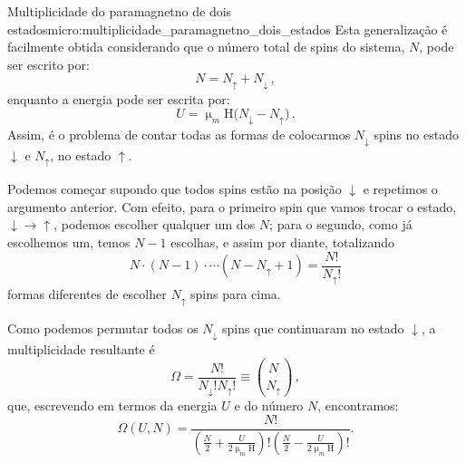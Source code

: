 \begin{example}{Multiplicidade do paramagnetno de dois estados}{micro:multiplicidade_paramagnetno_dois_estados}
        Esta generalização é facilmente obtida considerando que o número total de spins do sistema, $N$, pode ser escrito por:
        \[N = N_{\uparrow}+N_{\downarrow}\,,\]
        enquanto a energia pode ser escrita por:
        \[U=\upmu_m\mathrm{H}\big(N_{\downarrow}-N_{\uparrow}\big)\,.\]
        Assim, é o problema de contar todas as formas de colocarmos $N_{\downarrow}$ spins no estado $\downarrow$ e $N_{\uparrow}$, no estado $\uparrow$.

        Podemos começar supondo que todos spins estão na posição $\downarrow$ e repetimos o argumento anterior. Com efeito, para o primeiro spin que vamos trocar o estado, $\downarrow\to\uparrow$, podemos escolher qualquer um dos $N$; para o segundo, como já escolhemos um, temos $N-1$ escolhas, e assim por diante, totalizando
        \[N\cdot(N-1)\cdot\cdots(N-N_{\uparrow}+1) = \frac{N!}{N_{\uparrow}!}\] formas diferentes de escolher $N_{\uparrow}$ spins para cima.
        
        Como podemos permutar todos os $N_{\downarrow}$ spins que continuaram no estado $\downarrow$, a multiplicidade resultante é 
        \[\Omega = \frac{N!}{N_{\downarrow}!N_{\uparrow}!}\equiv\binom{N}{N_{\uparrow}}\,,\] que, escrevendo em termos da energia $U$ e do número $N$, encontramos:
        \[\Omega(U,N)=\frac{N!}{\left(\frac{N}{2}+\frac{U}{2\upmu_m\mathrm{H}}\right)!\left(\frac{N}{2}-\frac{U}{2\upmu_m\mathrm{H}}\right)!}.\]
    \end{example}

